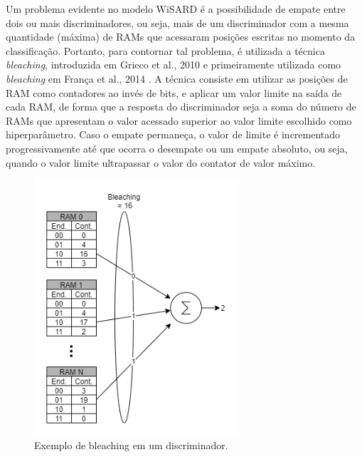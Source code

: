 Um problema evidente no modelo WiSARD é a possibilidade de empate entre dois ou mais discriminadores, ou seja, mais de um discriminador com a mesma quantidade (máxima) de RAMs que acessaram posições escritas no momento da classificação. Portanto, para contornar tal problema, é utilizada a técnica \textit{bleaching}, introduzida em Grieco et al., 2010 \cite{mentalimages} e primeiramente utilizada como \textit{bleaching} em França et al., 2014 \cite{advanceswns}. A técnica consiste em utilizar as posições de RAM como contadores ao invés de bits, e aplicar um valor limite na saída de cada RAM, de forma que a resposta do discriminador seja a soma do número de RAMs que apresentam o valor acessado superior ao valor limite escolhido como hiperparâmetro. Caso o empate permaneça, o valor de limite é incrementado progressivamente até que ocorra o desempate ou um empate absoluto, ou seja, quando o valor limite ultrapassar o valor do contator de valor máximo.

\begin{figure}[!ht] \label{fig:bleaching}
    \centering
    \includegraphics[width=3.0in]{img/bleaching.png}
    \caption{Exemplo de bleaching em um discriminador.}
\end{figure}

